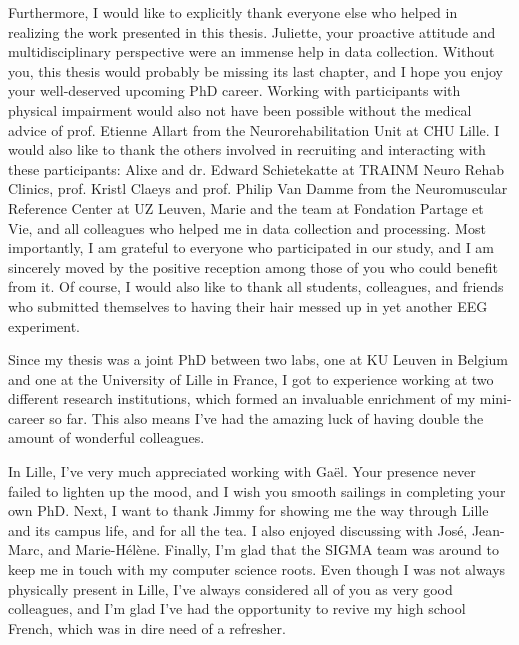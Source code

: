 Furthermore, I would like to explicitly thank everyone else who helped
in realizing the work presented in this thesis. Juliette, your
proactive attitude and multidisciplinary perspective were an immense help in
data collection. Without you, this thesis would probably be missing its
last chapter, and I hope you enjoy your well-deserved upcoming PhD
career. Working with participants with physical impairment would also
not have been possible without the medical advice of prof. Etienne
Allart from the Neurorehabilitation Unit at CHU Lille. I would also
like to thank the others involved in recruiting and interacting with
these participants: Alixe and dr. Edward Schietekatte at TRAINM Neuro
Rehab Clinics, prof. Kristl Claeys and prof. Philip Van Damme from the
Neuromuscular Reference Center at UZ Leuven, Marie and the team at
Fondation Partage et Vie, and all colleagues who helped me in data
collection and processing. Most importantly, I am grateful to everyone
who participated in our study, and I am sincerely moved by the positive
reception among those of you who could benefit from it. Of course, I
would also like to thank all students, colleagues, and friends who
submitted themselves to having their hair messed up in yet another EEG
experiment.

Since my thesis was a joint PhD between two labs, one at KU Leuven in
Belgium and one at the University of Lille in France, I got to
experience working at two different research institutions, which formed
an invaluable enrichment of my mini-career so far. This also means I've
had the amazing luck of having double the amount of wonderful
colleagues.

In Lille, I've very much appreciated working with Gaël. Your presence
never failed to lighten up the mood, and I wish you smooth sailings
in completing your own PhD. Next, I want to thank Jimmy for showing
me the way through Lille and its campus life, and for all the tea. I
also enjoyed discussing with José, Jean-Marc, and Marie-Hélène. Finally,
I'm glad that the SIGMA team was around to keep me in touch with
my computer science roots. Even though I was not always physically
present in Lille, I've always considered all of you as very good
colleagues, and I'm glad I've had the opportunity to revive my high
school French, which was in dire need of a refresher.

